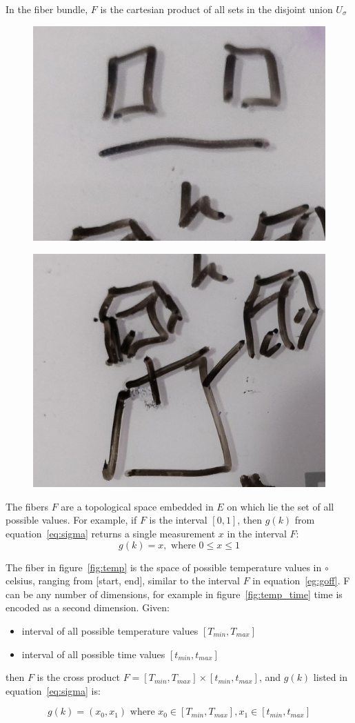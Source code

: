 \documentclass[../main.tex]{subfiles}
\begin{document}
In the fiber bundle, $F$ is the cartesian product of all sets in the disjoint union $U_{\sigma}$

\begin{figure}[ht]
    \includegraphics[width=0.2\linewidth]{figures/sections/math/temp_2f.png}
    \label{fig:}
\end{figure}
\begin{figure}[ht]
    \includegraphics[width=0.2\linewidth]{figures/sections/math/temp_3f.png}
\end{figure}


The fibers $F$ are a topological space embedded in $E$ on which lie the set of all possible values. For example, if $F$ is the interval $[0, 1]$, then $g(k)$ from equation~\ref{eq:sigma} returns a single measurement $x$ in the interval $F$:
\begin{equation}
    \label{eg:goff}
    g(k) = x, \text{ where } 0\leq x \leq 1
\end{equation}

The fiber in figure~\ref{fig:temp} is the space of possible temperature values in $\circ$ celsius, ranging from [start, end], similar to the interval $F$ in equation~\ref{eg:goff}. F can be any number of dimensions, for example in figure~\ref{fig:temp_time} time is encoded as a second dimension. Given:
\begin{itemize}
\item interval of all possible temperature values $[T_{min}, T_{max}]$ 
\item interval of all possible time values $[t_{min}, t_{max}]$
\end{itemize}

then $F$ is the cross product $F= [T_{min}, T_{max}] \times [t_{min}, t_{max}]$, and $g(k)$ listed in equation~\ref{eq:sigma} is:

\begin{equation}
g(k) = (x_0, x_1) \text{ where } x_0 \in [T_{min}, T_{max}], x_1 \in [t_{min}, t_{max}]
\end{equation}
\end{document}

